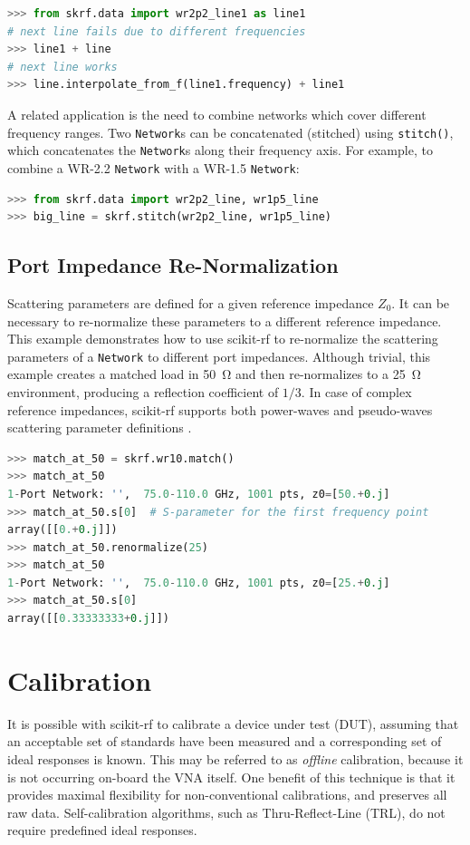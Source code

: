 \documentclass[10pt, letterpaper]{scrartcl}
\newcommand{\skrf}{{s}cikit-rf\xspace}
\begin{document}
\begin{lstlisting}[language=Python]
>>> from skrf.data import wr2p2_line1 as line1
# next line fails due to different frequencies
>>> line1 + line 
# next line works
>>> line.interpolate_from_f(line1.frequency) + line1  
\end{lstlisting}

A related application is the need to combine networks which cover different frequency ranges. Two \texttt{Network}s can be concatenated (stitched) using \texttt{stitch()}, which concatenates the \texttt{Network}s along their frequency axis. For example, to combine a WR-2.2 \texttt{Network} with a WR-1.5 \texttt{Network}:

\begin{lstlisting}[language=Python]
>>> from skrf.data import wr2p2_line, wr1p5_line
>>> big_line = skrf.stitch(wr2p2_line, wr1p5_line)
\end{lstlisting}

\subsection{Port Impedance Re-Normalization}
Scattering parameters are defined for a given reference impedance $Z_0$. It can be necessary to re-normalize these parameters to a different reference impedance. This example demonstrates how to use \skrf{} to re-normalize the  scattering parameters of a \texttt{Network} to different port impedances. Although trivial, this example creates a matched load in \SI{50}{\ohm} and then re-normalizes to a \SI{25}{\ohm} environment, producing a reflection coefficient of $1/3$. In case of complex reference impedances, \skrf{} supports both power-waves and pseudo-waves scattering parameter definitions \cite{williams2013}.

\begin{lstlisting}[language=Python]
>>> match_at_50 = skrf.wr10.match()
>>> match_at_50
1-Port Network: '',  75.0-110.0 GHz, 1001 pts, z0=[50.+0.j]
>>> match_at_50.s[0]  # S-parameter for the first frequency point
array([[0.+0.j]])
>>> match_at_50.renormalize(25)
>>> match_at_50
1-Port Network: '',  75.0-110.0 GHz, 1001 pts, z0=[25.+0.j]
>>> match_at_50.s[0]
array([[0.33333333+0.j]])
\end{lstlisting}

\section{Calibration}
It is possible with \skrf{} to calibrate a device under test (DUT), assuming that an acceptable set of standards have been measured and a corresponding set of ideal responses is known. This may be referred to as \textit{offline} calibration, because it is not occurring on-board the VNA itself. One benefit of this technique is that it provides maximal flexibility for non-conventional calibrations, and preserves all raw data. Self-calibration algorithms, such as Thru-Reflect-Line (TRL)\cite{engen1979}, do not require predefined ideal responses.
\end{document}
